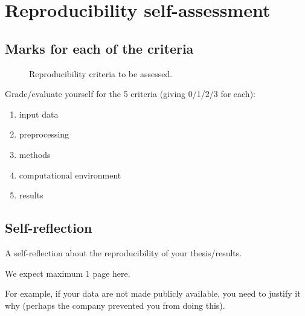 

\chapter{Reproducibility self-assessment}

\section{Marks for each of the criteria}

\begin{figure}[h]
  \centering
  \caption{Reproducibility criteria to be assessed.}
\label{fig:reproducibility_criteria}
\end{figure}

Grade/evaluate yourself for the 5 criteria (giving 0/1/2/3 for each):
\begin{enumerate}
  \item input data
  \item preprocessing
  \item methods
  \item computational environment
  \item results
\end{enumerate}


\section{Self-reflection}

A self-reflection about the reproducibility of your thesis/results.

We expect maximum 1 page here.

For example, if your data are not made publicly available, you need to justify it why (perhaps the company prevented you from doing this).
